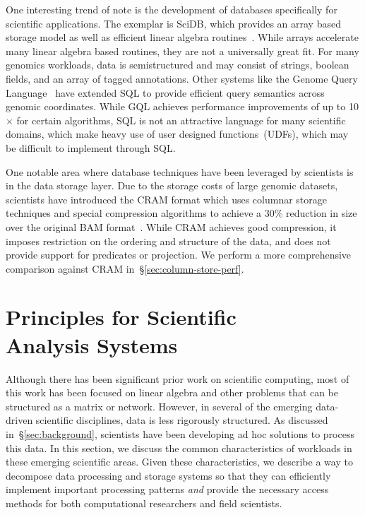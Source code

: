 \documentclass{acm_proc_article-sp}
\begin{document}
One interesting trend of note is the development of databases specifically for scientific applications.
The exemplar is SciDB, which provides an array based storage model as well as efficient linear algebra
routines~\cite{brown10}. While arrays accelerate many linear algebra based routines, they are not
a universally great fit. For many genomics workloads, data is semistructured and may consist of strings,
boolean fields, and an array of tagged annotations. Other systems like the Genome Query
Language~\cite{kozanitis14} have extended SQL to provide efficient query semantics across genomic
coordinates. While GQL achieves performance improvements of up to 10$\times$ for certain algorithms,
SQL is not an attractive language for many scientific domains, which make heavy use of user designed
functions~(UDFs), which may be difficult to implement through SQL.

One notable area where database techniques have been leveraged by scientists is in the data storage
layer. Due to the storage costs of large genomic datasets, scientists have introduced the CRAM format
which uses columnar storage techniques and special compression algorithms to achieve a 30\%
reduction in size over the original BAM format~\cite{fritz11}. While CRAM achieves good compression,
it imposes restriction on the ordering and structure of the data, and does not provide support for
predicates or projection. We perform a more comprehensive comparison against CRAM
in~\S\ref{sec:column-store-perf}.

\section{Principles for Scientific \\ Analysis Systems}
\label{sec:principles}

Although there has been significant prior work on scientific computing, most of this work has been
focused on linear algebra and other problems that can be structured as a matrix or network. However,
in several of the emerging data-driven scientific disciplines, data is less rigorously structured. As discussed
in~\S\ref{sec:background}, scientists have been developing ad hoc solutions to process this data. In this
section, we discuss the common characteristics of workloads in these emerging scientific areas. Given
these characteristics, we describe a way to decompose data processing and storage systems so that
they can efficiently implement important processing patterns \emph{and} provide the necessary access
methods for both computational researchers and field scientists.
\end{document}
